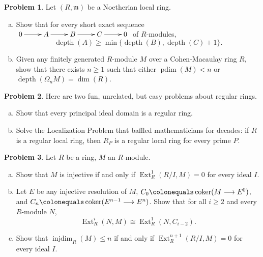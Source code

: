\documentclass[11pt]{article}
\DeclareMathOperator{\coker}{coker}
\DeclareMathOperator{\Ext}{Ext}
\DeclareMathOperator{\depth}{depth}
\DeclareMathOperator{\pdim}{pdim}
\DeclareMathOperator{\injdim}{inj dim}
\newcommand{\m}{\mathfrak{m}}
\theoremstyle{definition}
\newtheorem{problem}{Problem}
\begin{document}
\begin{problem}
	Let $(R,\m)$ be a Noetherian local ring.
	\begin{enumerate}[a)]
		\item Show that for every short exact sequence $\xymatrix{0 \ar[r] & A \ar[r] & B \ar[r] & C \ar[r] & 0}$ of $R$-modules,
		$$\depth(A) \geqslant \min \lbrace \depth(B), \depth(C) + 1 \rbrace.$$
		\item Given any finitely generated $R$-module $M$ over a Cohen-Macaulay ring $R$, show that there exists $n \geqslant 1$ such that either $\pdim(M) < n$ or $\depth(\Omega_n M) = \dim(R)$.
	\end{enumerate}
\end{problem}

\vfill

\begin{problem} Here are two fun, unrelated, but easy problems about regular rings.
	\begin{enumerate}[a)]
	\item Show that every principal ideal domain is a regular ring.
	\item Solve the Localization Problem that baffled mathematicians for decades: if $R$ is a regular local ring, then $R_P$ is a regular local ring for every prime $P$.
	\end{enumerate}
\end{problem}

\newpage

\begin{problem}
	Let $R$ be a ring, $M$ an $R$-module.
	\begin{enumerate}[a)]
		\item Show that $M$ is injective if and only if $\Ext_R^1(R/I,M) = 0$ for every ideal $I$.
		\item Let $E$ be any injective resolution of $M$, $C_0 \colonequals \coker(M \longrightarrow E^0)$, and $C_n \colonequals \coker(E^{n-1} \longrightarrow E^n)$. Show that for all $i \geqslant 2$ and every $R$-module $N$,
		$$\Ext^i_R(N,M) \cong \Ext^1_R(N,C_{i-2}).$$
		\item Show that $\injdim_R(M) \leqslant n$ if and only if $\Ext_R^{n+1}(R/I,M) = 0$ for every ideal $I$.
	\end{enumerate}
\end{problem}


\
\end{document}
